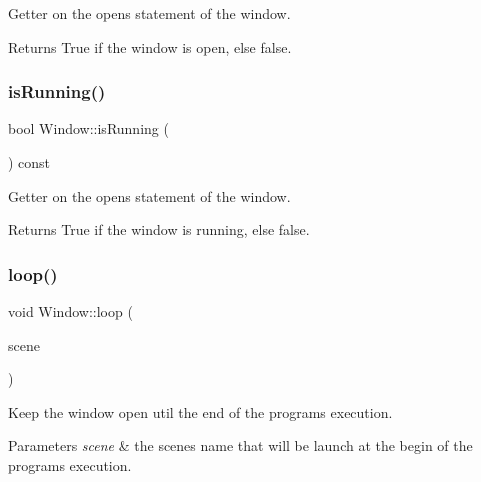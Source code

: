 Getter on the open\textquotesingle{}s statement of the window. 

\begin{DoxyReturn}{Returns}
True if the window is open, else false. 
\end{DoxyReturn}
\mbox{\label{classWindow_a53329abfc23df8a908ce7002c88dc244}} 
\subsubsection{\texorpdfstring{is\+Running()}{isRunning()}}
{\footnotesize\ttfamily bool Window\+::is\+Running (\begin{DoxyParamCaption}{ }\end{DoxyParamCaption}) const}



Getter on the open\textquotesingle{}s statement of the window. 

\begin{DoxyReturn}{Returns}
True if the window is running, else false. 
\end{DoxyReturn}
\mbox{\label{classWindow_a2b026b4d11c9a67b5103921de251cd46}} 
\subsubsection{\texorpdfstring{loop()}{loop()}}
{\footnotesize\ttfamily void Window\+::loop (\begin{DoxyParamCaption}\item[{const std\+::shared\+\_\+ptr$<$ \hyperlink{classAScene}{A\+Scene} $>$ \&}]{scene }\end{DoxyParamCaption})}



Keep the window open util the end of the program\textquotesingle{}s execution. 


\begin{DoxyParams}{Parameters}
{\em scene} & the scene\textquotesingle{}s name that will be launch at the begin of the program\textquotesingle{}s execution. \\
\hline
\end{DoxyParams}
\mbox{\label{classWindow_ac2515da6ca76f5f4466c7421e95cddfe}} 
